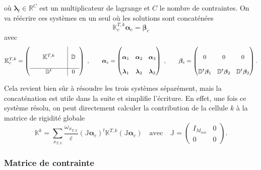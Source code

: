 \documentclass[11pt]{article}
\newcommand{\R}{\mathbb{R}}
\newcommand{\D}{\mathbb{D}}
\newcommand{\J}{\mathbb{J}}
\newcommand{\Kk}{\mathbb{K}^k}
\newcommand{\Ktk}{\mathbb{K}^{T,k}}
\newcommand{\Ktkc}{\mathbb{K}^{T, k}_c}
\newcommand{\balpha}{\bm{\alpha}}
\newcommand{\bbeta}{\bm{\beta}}
\newcommand{\blambda}{\bm{\lambda}}
\newcommand{\balphac}{\bm{\alpha}_c}
\newcommand{\bbetac}{\bm{\beta}_c}
\newcommand{\xtk}{x_{T,k}}
\begin{document}
où $\blambda_l \in \R^C$ est un multiplicateur de lagrange et $C$ le nombre de contraintes. On va réécrire ces systèmes en un seul où les
solutions sont concaténées
\begin{equation}
  \Ktkc \balphac = \bbetac
\end{equation}
avec
\[
  \Ktkc = \left(
    \begin{tabular}{ccc|c}
      ~ & ~     & ~ & ~      \\
      ~ & $\Ktk$ & ~ & $\D$ \\
      ~ & ~     & ~ & ~      \\
      \hline
      ~ & $\D^t$  & ~ & 0
    \end{tabular}
  \right)
  ~,\qquad
  \balphac = \left(
    \begin{matrix}
      ~         & ~         & ~         \\
      \balpha_1 & \balpha_2 & \balpha_3 \\
      ~         & ~         & ~         \\
      \blambda_1 & \blambda_2 & \blambda_3
    \end{matrix}
  \right)
  ~,\qquad
    \bbetac = \left(
    \begin{matrix}
      ~          & ~          & ~ \\
      0          & 0          & 0 \\
      ~          & ~          & ~ \\
      \D^t\bbeta_1 & \D^t\bbeta_2 & \D^t\bbeta_3  
    \end{matrix}
  \right).
\]

Cela revient bien sûr à résoudre les trois systèmes séparément, mais la concaténation est utile dans la suite et simplifie l'écriture. En effet, une
fois ce système résolu, on peut directement calculer la contribution de la cellule $k$ à la matrice de rigidité globale
\[
  \Kk = \sum_{\xtk} \frac{\omega_{\xtk}}{\varepsilon} (\J\balphac)^t \Ktk (\J\balphac)
  \quad \text{avec} \quad
  \J = \left(
    \begin{matrix}
      I_{M_{mic}} & 0 \\
      0           & 0
    \end{matrix}
  \right).
\]


\subsubsection{Matrice de contrainte}
\end{document}
